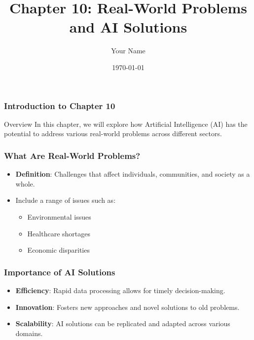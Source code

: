\documentclass{beamer}
\title{Chapter 10: Real-World Problems and AI Solutions}
\author{Your Name}
\institute{Your Institution}
\date{\today}
\begin{document}
\frame{\titlepage}

\begin{frame}[fragile]
    \frametitle{Introduction to Chapter 10}
    \begin{block}{Overview}
        In this chapter, we will explore how Artificial Intelligence (AI) has the potential to address various real-world problems across different sectors.
    \end{block}
\end{frame}

\begin{frame}[fragile]
    \frametitle{What Are Real-World Problems?}
    \begin{itemize}
        \item \textbf{Definition}: Challenges that affect individuals, communities, and society as a whole.
        \item Include a range of issues such as:
        \begin{itemize}
            \item Environmental issues
            \item Healthcare shortages
            \item Economic disparities
        \end{itemize}
    \end{itemize}
\end{frame}

\begin{frame}[fragile]
    \frametitle{Importance of AI Solutions}
    \begin{itemize}
        \item \textbf{Efficiency}: Rapid data processing allows for timely decision-making.
        \item \textbf{Innovation}: Fosters new approaches and novel solutions to old problems.
        \item \textbf{Scalability}: AI solutions can be replicated and adapted across various domains.
    \end{itemize}
\end{frame}
\end{document}
